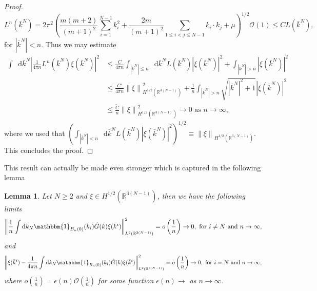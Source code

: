 \documentclass[a4paper,11pt]{article}
\newcommand{\norm}[1]{\left\lVert #1 \right\rVert}
\newcommand{\abs}[1]{\left\lvert #1 \right\rvert}
\newcommand*\diff{\mathop{}\!\mathrm{d}}
\newcommand{\R}{\mathbb{R}}
\newtheorem{lemma}{Lemma}
\numberwithin{equation}{section}
\begin{document}
\begin{proof}
\begin{equation}
	L^n(\bar{k}^N)=2\pi^2\left(\frac{m(m+2)}{(m+1)^2}\sum_{i=1}^{N-1}k_i^2+\frac{2m}{(m+1)^2}\sum_{1\leq i<j\leq N-1}k_i\cdot k_j+\mu\right)^{1/2}\mathcal{O}(1)\leq CL(\bar{k}^N),
	\end{equation} 
	for $ \abs{\bar{k}^N}<n $. Thus we may estimate\begin{equation}
	\begin{aligned}
	\int\diff \bar{k}^N\abs{\frac{1}{4\pi n}L^n(\bar{k}^N)\xi(\bar{k}^N)}^2&\leq \frac{C}{4\pi n}\int_{\abs{\bar{k}^N}\leq n}\diff\bar{k}^N L(\bar{k}^N)\abs{\xi(\bar{k}^N)}^2+\int_{\abs{\bar{k}^N}>n}\abs{\xi(\bar{k}^N)}^2
	\\&\leq\frac{C'}{4\pi n}\norm{\xi}^2_{H^{1/2}(\R^{3(N-1)})}+\frac{1}{n}\int_{\abs{\bar{k}^N}>n}\sqrt{\abs{\bar{k}^N}^2+1}\abs{\xi(\bar{k}^N)}^2\\&
	\leq\frac{\tilde{C}}{n}\norm{\xi}^2_{H^{1/2}(\R^{3(N-1)})}\to0\text{ as }n\to\infty,
	\end{aligned}
	\end{equation}
	where we used that $\left(\int_{\abs{\bar{k}^N}<n}\diff\bar{k}^N L(\bar{k}^N)\abs{\xi(\bar{k}^N)}^2\right)^{1/2}\equiv\norm{\xi}_{H^{1/2}(\R^{3(N-1)})}  $. This concludes the proof.
\end{proof}
This result can actually be made even stronger which is captured in the following lemma
\begin{lemma}\label{lemmaxiCon2}
	Let $ N\geq2 $ and $ \xi\in H^{1/2}(\R^{3(N-1)}) $, then we have the following limits\begin{equation}
	\norm{\frac{1}{n}\int \diff k_N \mathbbm{1}_{B_n(0)}(k_i)\hat{G}(k)\xi(\bar{k}^i)}^2_{L^2(\R^{3(N-1)})}=o\left(\frac{1}{n}\right)\to 0,\text{ for }i\neq N\text{ and }n\to\infty,
	\end{equation}
	and \begin{equation}
	\norm{\xi(\bar{k}^i)-\frac{1}{4\pi n}\int \diff k_N \mathbbm{1}_{B_n(0)}(k_i)\hat{G}(k)\xi(\bar{k}^i)}^2_{L^2(\R^{3(N-1)})}=o\left(\frac{1}{n}\right)\to 0,\text{ for }i= N\text{ and }n\to\infty,
	\end{equation}
	where $ o\left(\frac{1}{n}\right)=\epsilon(n)\mathcal{O}(\frac{1}{n}) $ for some function $ \epsilon(n)\to $ as $ n\to\infty $.
\end{lemma}
\end{document}
